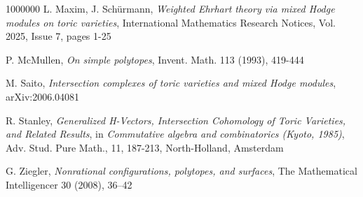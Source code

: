 \documentclass[12pt,leqno,twoside]{amsart}
\begin{document}
\begin{thebibliography}{1000000}
     L. Maxim, J. Sch\"urmann, {\it Weighted Ehrhart theory via mixed Hodge modules on toric varieties}, International Mathematics Research Notices, Vol. 2025, Issue 7, pages 1-25

   

     P. McMullen, {\it On simple polytopes}, Invent. Math. 113 (1993), 419-444

       M. Saito, {\it Intersection complexes of toric varieties and mixed Hodge modules}, arXiv:2006.04081

     R. Stanley, {\it Generalized H-Vectors, Intersection Cohomology of Toric Varieties, and Related Results}, in {\it Commutative algebra and combinatorics (Kyoto, 1985)}, Adv. Stud. Pure Math., 11, 187-213, North-Holland, Amsterdam


     G. Ziegler, {\it Nonrational configurations, polytopes, and surfaces}, The Mathematical Intelligencer 30 (2008), 36–42
    
\end{thebibliography}
\end{document}
